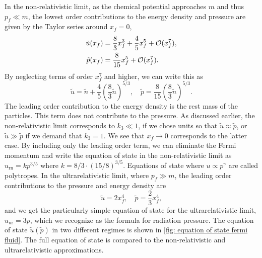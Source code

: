 In the non-relativistic limit, as the chemical potential approaches $m$ and thus $p_f \ll m$, the lowest order contributions to the energy density and pressure are given by the Taylor series around $x_f = 0$,
%
\begin{align}
    \tilde u(x_f) &= \frac{8}{3}x_f^3 + \frac{4}{5} x_f^5 + \mathcal O(x_f^7),  \\
    \tilde p(x_f) &= \frac{8}{15}x_f^5 + \mathcal O(x_f^7).
\end{align}
%
By neglecting terms of order $x_f^7$ and higher, we can write this as
%
\begin{equation}
    \tilde u = \tilde n + \frac{4}{5} \left( \frac{8}{3} \tilde n \right)^{5/3},
    \quad
    \tilde p =  \frac{8}{15} \left( \frac{8}{3} \tilde n \right)^{5/3}.
\end{equation}
%
The leading order contribution to the energy density is the rest mass of the particles.
This term does not contribute to the pressure.
As discussed earlier, the non-relativistic limit corresponds to $k_3 \ll 1$, if we chose units so that $\tilde u \approx \tilde p$, or $\tilde u \gg \tilde p$ if we demand that $k_3 = 1$.
We see that $x_f \rightarrow 0$ corresponds to the latter case.
By including only the leading order term, we can eliminate the Fermi momentum and write the equation of state in the non-relativistic limit as $u_{\mathrm{rn}} = k p^{3/5}$ where $k = 8/3 \cdot (15/8)^{3/5}$.
Equations of state where $u \propto p^{\gamma}$ are called polytropes.
In the ultrarelativistic limit, where $p_f \gg m$, the leading order contributions to the pressure and energy density are
%
\begin{equation}
    \tilde u = 2 x_f^4, \quad \tilde p = \frac{2}{3} x_f^4, 
\end{equation}
%
and we get the particularly simple equation of state for the ultrarelativistic limit, $ u_{\mathrm{ur}} = 3 p $, which we recognize as the formula for radiation pressure.
The equation of state $\tilde u(\tilde p)$ in two different regimes is shown in \autoref{fig: equation of state fermi fluid}.
The full equation of state is compared to the non-relativistic and ultrarelativistic approximations.

